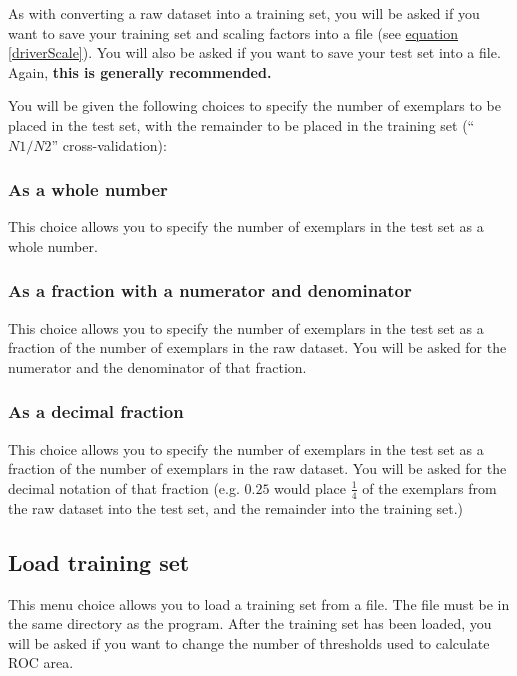 As with converting a raw dataset into a training set, you will be
asked if you want to save your training set and scaling factors into a
file (see \hyperref[driverScale]{equation \ref{driverScale}}).  You
will also be asked if you want to save your test set into a file.
Again, {\bf this is generally recommended.}

You will be given the following choices to specify the number of
exemplars to be placed in the test set, with the remainder to be
placed in the training set (``$N1/N2$'' cross-validation):

\subsubsection{As a whole number}

This choice allows you to specify the number of exemplars in the test
set as a whole number.

\subsubsection{As a fraction with a numerator and denominator}

This choice allows you to specify the number of exemplars in the test
set as a fraction of the number of exemplars in the raw dataset.  You
will be asked for the numerator and the denominator of that fraction.

\subsubsection{As a decimal fraction}

This choice allows you to specify the number of exemplars in the test
set as a fraction of the number of exemplars in the raw dataset.  You
will be asked for the decimal notation of that fraction (e.g. $0.25$
would place $\frac{1}{4}$ of the exemplars from the raw dataset into
the test set, and the remainder into the training set.)

\subsection{Load training set}

This menu choice allows you to load a training set from a file.  The
file must be in the same directory as the program.  After the training
set has been loaded, you will be asked if you want to change the
number of thresholds used to calculate ROC area.


